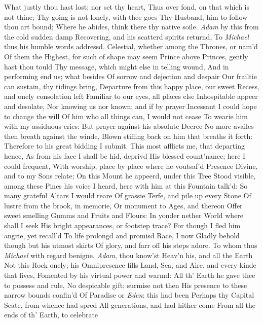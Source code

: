 \documentclass[11pt]{book}
\begin{document}
What justly thou hast lost; nor set thy heart, 
Thus over fond, on that which is not thine; 
Thy going is not lonely, with thee goes 
Thy Husband, him to follow thou art bound; 
Where he abides, think there thy native soile. 
\quad \textit{Adam} by this from the cold sudden damp 
Recovering, and his scatterd spirits returnd, 
To \textit{Michael} thus his humble words addressd. 
\quad Celestial, whether among the Thrones, or nam'd 
Of them the Highest, for such of shape may seem 
Prince above Princes, gently hast thou tould 
Thy message, which might else in telling wound, 
And in performing end us; what besides 
Of sorrow and dejection and despair 
Our frailtie can sustain, thy tidings bring, 
Departure from this happy place, our sweet 
Recess, and onely consolation left 
Familiar to our eyes, all places else 
Inhospitable appeer and desolate, 
Nor knowing us nor known: and if by prayer 
Incessant I could hope to change the will 
Of him who all things can, I would not cease 
To wearie him with my assiduous cries: 
But prayer against his absolute Decree 
No more availes then breath against the winde, 
Blown stifling back on him that breaths it forth: 
Therefore to his great bidding I submit. 
This most afflicts me, that departing hence, 
As from his face I shall be hid, deprivd 
His blessed count'nance; here I could frequent, 
With worship, place by place where he voutsaf'd 
Presence Divine, and to my Sons relate; 
On this Mount he appeerd, under this Tree 
Stood visible, among these Pines his voice 
I heard, here with him at this Fountain talk'd: 
So many grateful Altars I would reare 
Of grassie Terfe, and pile up every Stone 
Of lustre from the brook, in memorie, 
Or monument to Ages, and thereon 
Offer sweet smelling Gumms and Fruits and Flours: 
In yonder nether World where shall I seek 
His bright appearances, or footstep trace? 
For though I fled him angrie, yet recall'd 
To life prolongd and promisd Race, I now 
Gladly behold though but his utmost skirts 
Of glory, and farr off his steps adore. 
\quad To whom thus \textit{Michael} with regard benigne. 
\textit{Adam}, thou know'st Heav'n his, and all the Earth 
Not this Rock onely; his Omnipresence fills 
Land, Sea, and Aire, and every kinde that lives, 
Fomented by his virtual power and warmd: 
All th' Earth he gave thee to possess and rule, 
No despicable gift; surmise not then 
His presence to these narrow bounds confin'd 
Of Paradise or \textit{Eden}: this had been 
Perhaps thy Capital Seate, from whence had spred 
All generations, and had hither come 
From all the ends of th' Earth, to celebrate 
\end{document}
